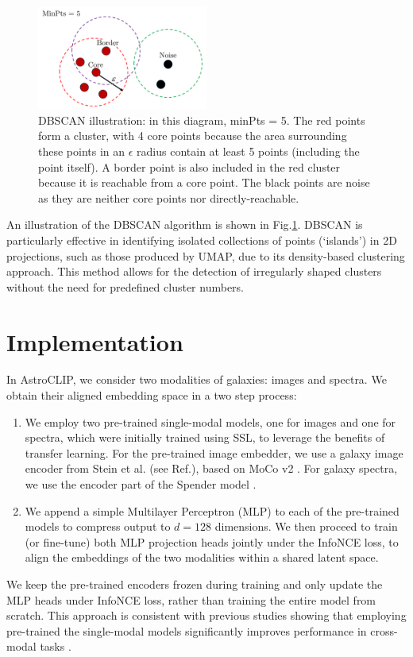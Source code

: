 \documentclass[a4paper,12pt]{article}
\begin{document}
 \begin{figure}[H]
     \centering
     \includegraphics[width=0.5\textwidth]{../figures/dbscan_diagram.png}
     \caption{DBSCAN illustration: in this diagram, minPts = 5. 
     The red points form a cluster, with 4 core points because the area surrounding these points in an $\epsilon$ radius contain at least 5 points (including the point itself). A border point is also included in the red cluster because it is reachable from a core point. The black points are noise as they are neither core points nor directly-reachable.}
     \label{fig:dbscan}
 \end{figure}
 An illustration of the DBSCAN algorithm is shown in Fig.\ref{fig:dbscan}. DBSCAN is particularly effective in identifying isolated collections of points (`islands') in 2D projections, such as those produced by UMAP, due to its density-based clustering approach. This method allows for the detection of irregularly shaped clusters without the need for predefined cluster numbers. 


\section{Implementation}
\label{sec:implementation}
In AstroCLIP, we consider two modalities of galaxies: images and spectra. We obtain their aligned embedding space in a two step process:
\begin{enumerate}
    \item We employ two pre-trained single-modal models, one for images and one for spectra, which were initially trained using SSL, to leverage the benefits of transfer learning. For the pre-trained image embedder, we use a galaxy image encoder from Stein et al. (see Ref.\cite{stein}), based on MoCo v2 \cite{mocov2}. For galaxy spectra, we use the encoder part of the Spender model \cite{spender}.
    \item We append a simple Multilayer Perceptron (MLP) to each of the pre-trained models to compress output to $d=128$ dimensions. We then proceed to train (or fine-tune) both MLP projection heads jointly under the InfoNCE loss, to align the embeddings of the two modalities within a shared latent space.
    \end{enumerate}
We keep the pre-trained encoders frozen during training and only update the MLP heads under InfoNCE loss, rather than training the entire model from scratch. This approach is consistent with previous studies showing that employing pre-trained the single-modal models significantly improves performance in cross-modal tasks \cite{crossCLIP}.
\end{document}
